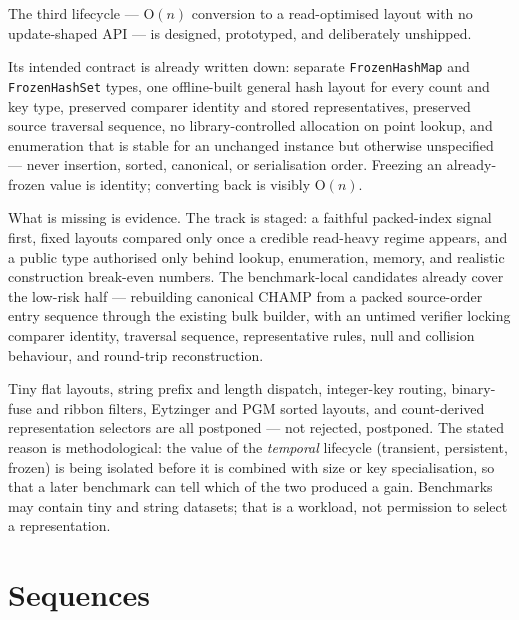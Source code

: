 \documentclass[11pt,twoside,openright]{book}
\newcommand{\code}[1]{\texorpdfstring{\textcolor{d7ink}{\texttt{#1}}}{#1}}
\newcommand{\bigoh}[1]{$\mathrm{O}(#1)$}
\begin{document}
The third lifecycle --- \bigoh{n} conversion to a read-optimised layout with no
update-shaped API --- is designed, prototyped, and deliberately unshipped.

Its intended contract is already written down: separate \code{FrozenHashMap} and
\code{FrozenHashSet} types, one offline-built general hash layout for every count
and key type, preserved comparer identity and stored representatives, preserved
source traversal sequence, no library-controlled allocation on point lookup, and
enumeration that is stable for an unchanged instance but otherwise unspecified
--- never insertion, sorted, canonical, or serialisation order. Freezing an
already-frozen value is identity; converting back is visibly \bigoh{n}.

What is missing is evidence. The track is staged: a faithful packed-index signal
first, fixed layouts compared only once a credible read-heavy regime appears, and
a public type authorised only behind lookup, enumeration, memory, and realistic
construction break-even numbers. The benchmark-local candidates already cover the
low-risk half --- rebuilding canonical CHAMP from a packed source-order entry
sequence through the existing bulk builder, with an untimed verifier locking
comparer identity, traversal sequence, representative rules, null and collision
behaviour, and round-trip reconstruction.

\begin{asidebox}
Tiny flat layouts, string prefix and length dispatch, integer-key routing,
binary-fuse and ribbon filters, Eytzinger and PGM sorted layouts, and
count-derived representation selectors are all postponed --- not rejected,
postponed. The stated reason is methodological: the value of the \emph{temporal}
lifecycle (transient, persistent, frozen) is being isolated before it is
combined with size or key specialisation, so that a later benchmark can tell
which of the two produced a gain. Benchmarks may contain tiny and string
datasets; that is a workload, not permission to select a representation.
\end{asidebox}

\part{Sequences}
\label{part:sequences}
\end{document}
